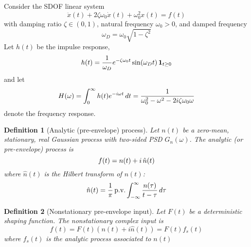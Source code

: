 \documentclass{article}
\newcommand{\tmem}[1]{{\em #1\/}}
\newtheorem{definition}{Definition}
\begin{document}
Consider the SDOF linear system
\begin{equation}
  \label{eq:motion} \ddot{x} (t) + 2 \zeta \omega_0  \dot{x} (t) + \omega_0^2
  x (t) = f (t)
\end{equation}
with damping ratio $\zeta \in (0, 1)$, natural frequency $\omega_0 > 0$, and
damped frequency
\begin{equation}
  \omega_D = \omega_0  \sqrt{1 - \zeta^2}
\end{equation}
Let $h (t)$ be the impulse response,
\begin{equation}
  \label{eq:h} h (t) = \frac{1}{\omega_D} e^{- \zeta \omega_0 t} \sin
  (\omega_D t)  \hspace{0.17em} \textbf{1}_{t \ge 0}
\end{equation}
and let
\begin{equation}
  H (\omega) = \int_0^{\infty} h (t) e^{- i \omega t}  \hspace{0.17em} dt =
  \frac{1}{\omega_0^2 - \omega^2 - 2 i \zeta \omega_0 \omega}
\end{equation}
denote the frequency response.

\begin{definition}
  [Analytic (pre-envelope) process] Let $n (t)$ be a zero-mean, stationary,
  real Gaussian process with two-sided PSD $G_n (\omega)$. The {\tmem{analytic
  (or pre-envelope) process}} is
  \begin{equation}
    \label{eq:analytic} f (t) = n (t) + i \hspace{0.17em} \hat{n} (t)
  \end{equation}
  where $\hat{n} (t)$ is the Hilbert transform of $n (t)$:
  \begin{equation}
    \label{eq:hilbert} \hat{n} (t) = \frac{1}{\pi}  \hspace{0.17em}
    \text{p.v.} \int_{- \infty}^{\infty} \frac{n (\tau)}{t - \tau} 
    \hspace{0.17em} d \tau
  \end{equation}
\end{definition}

\begin{definition}
  [Nonstationary pre-envelope input] Let $F (t)$ be a deterministic shaping
  function. The nonstationary complex input is
  \begin{equation}
    \label{eq:nonstat_input} f (t) = F (t)  (n (t) + i \hat{n} (t)) = F (t)
    f_s (t)
  \end{equation}
  where $f_s (t)$ is the analytic process associated to $n (t)$
\end{definition}
\end{document}
